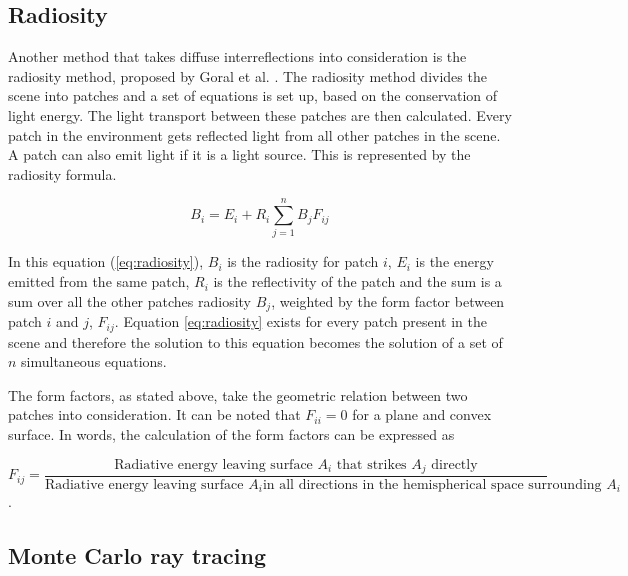 \documentclass[a4paper]{report}
\begin{document}
\subsection{Radiosity}

Another method that takes diffuse interreflections into consideration
is the radiosity method, proposed by Goral et al. \cite{goral}. The
radiosity method divides the scene into patches and a set of equations
is set up, based on the conservation of light energy. The light transport
between these patches are then calculated. Every patch in the
environment gets reflected light from all other patches in the
scene. A patch can also emit light if it is a light source. This is
represented by the radiosity formula.

\begin{equation}
  B_i = E_i + R_i\sum^n_{j=1}B_jF_{ij}
  \label{eq:radiosity}
\end{equation}

In this equation (\ref{eq:radiosity}), \(B_i\) is the radiosity for
patch \(i\), \(E_i\) is the energy emitted from the same patch,
\(R_i\) is the reflectivity of the patch and the sum is a sum over all
the other patches radiosity \(B_j\), weighted by the form factor
between patch \(i\) and \(j\), \(F_{ij}\). Equation \ref{eq:radiosity}
exists for every patch present in the scene and therefore the solution
to this equation becomes the solution of a set of \(n\) simultaneous equations.

The form factors, as stated above, take the geometric relation between
two patches into consideration. It can be noted that \(F_{ii} = 0 \)
for a plane and convex surface. In words, the calculation of the form
factors can be expressed as

\begin{equation}
  F_{ij} = \frac{\text{Radiative energy leaving surface } A_i \text{ that
    strikes } A_j \text{ directly}}{\text{Radiative energy leaving
    surface } A_i \text{in all directions in the hemispherical space
    surrounding } A_i}
\end{equation}.

\subsection{Monte Carlo ray tracing}
\end{document}
